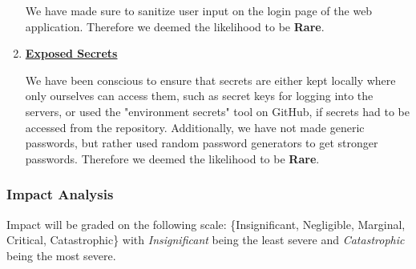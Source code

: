 \begin{enumerate}
    We have made sure to sanitize user input on the login page of the web application. Therefore we deemed the likelihood to be \textbf{Rare}.
    \item \textbf{\underline{Exposed Secrets}}

    We have been conscious to ensure that secrets are either kept locally where only ourselves can access them, such as secret keys for logging into the servers, or used the "environment secrets" tool on GitHub, if secrets had to be accessed from the repository. Additionally, we have not made generic passwords, but rather used random password generators to get stronger passwords. Therefore we deemed the likelihood to be \textbf{Rare}.
\end{enumerate}
\subsubsection{Impact Analysis}
Impact will be graded on the following scale: \{Insignificant, Negligible, Marginal, Critical, Catastrophic\} with \textit{Insignificant} being the least severe and \textit{Catastrophic} being the most severe.
